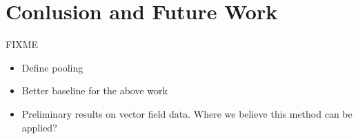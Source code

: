 \section{Conlusion and Future Work}

FIXME

\begin{itemize}
\item Define pooling
\item Better baseline for the above work
\item Preliminary results on vector field data. Where we believe this method can be applied?
\end{itemize}